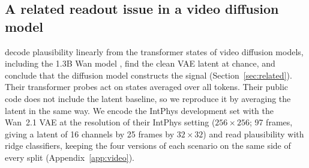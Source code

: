 \subsection{A related readout issue in a video diffusion model}
\label{sec:video}

\begin{table}[t]
\centering
\caption{IntPhys development set, plausibility read from the clean Wan~2.1 VAE latent (360 videos, 90 scenarios; scenario-grouped 5-fold cross-validation, 10 repeats, 3 for the nonlinear temporal probe; mean $\pm$ standard deviation). Pairwise: share of possible/impossible pairs within a scenario in which the possible video scores higher. Chance is 50\% for both.}
\label{tab:intphys}

\end{table}

\citet{esmati2026invisible} decode plausibility linearly from the transformer states of video diffusion models, including the 1.3B Wan model \citep{wan2025}, find the clean VAE latent at chance, and conclude that the diffusion model constructs the signal (Section~\ref{sec:related}). Their transformer probes act on states averaged over all tokens. Their public code does not include the latent baseline, so we reproduce it by averaging the latent in the same way. We encode the IntPhys development set \citep{riochet2018intphys} with the Wan~2.1 VAE at the resolution of their IntPhys setting ($256 \times 256$; 97 frames, giving a latent of 16 channels by 25 frames by $32 \times 32$) and read plausibility with ridge classifiers, keeping the four versions of each scenario on the same side of every split (Appendix~\ref{app:video}).

